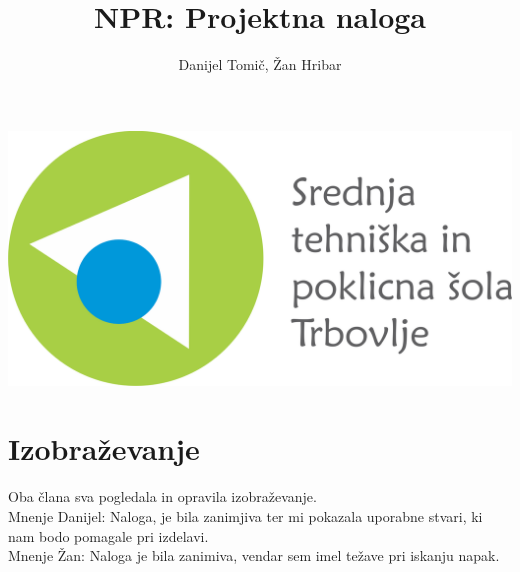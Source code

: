 \documentclass[a4paper]{article}
\author{Danijel Tomič, Žan Hribar}
\title{NPR: Projektna naloga}
\begin{document}
\maketitle

\begin{center}
\includegraphics[scale=0.5]{Logotip-z-napisom.png}
\end{center}
\newpage


\section{Izobraževanje}
Oba člana sva pogledala in opravila izobraževanje.\\
Mnenje Danijel: Naloga, je bila zanimjiva ter mi pokazala uporabne stvari, ki nam bodo pomagale pri izdelavi. \\
Mnenje Žan: Naloga je bila zanimiva, vendar sem imel težave pri iskanju napak.
\end{document}
